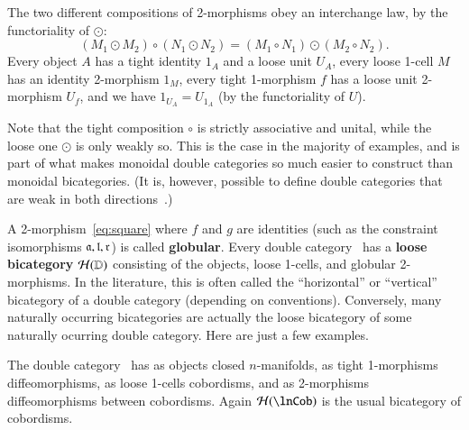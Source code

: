 The two different compositions of 2-morphisms obey an interchange law,
by the functoriality of $\odot$:
\[(M_1\odot M_2) \circ (N_1\odot N_2) = (M_1\circ N_1)\odot (M_2\circ N_2).
\]
Every object $A$ has a tight identity $1_A$ and a loose unit
$U_A$, every loose 1-cell $M$ has an identity 2-morphism $1_M$, every
tight 1-morphism $f$ has a loose unit 2-morphism $U_f$, and we
have $1_{U_A} = U_{1_A}$ (by the functoriality of $U$).

Note that the tight composition $\circ$ is strictly associative and
unital, while the loose one $\odot$ is only weakly so.  This is
the case in the majority of examples, and is part of what makes monoidal double categories so much easier to construct than monoidal bicategories.
(It is, however, possible to define double categories that are weak in both directions~\cite{verity:base-change}.)



A 2-morphism~\eqref{eq:square} where $f$ and $g$ are identities (such
as the constraint isomorphisms $\mathfrak{a},\mathfrak{l},\mathfrak{r}$) is called
\textbf{globular}.  Every double category \lD\ has a
\textbf{loose bicategory} $\mathcal{H}(\mathbb{D})$ consisting of the objects,
loose 1-cells, and globular 2-morphisms.  In the literature, this is often called the ``horizontal'' or ``vertical'' bicategory of a double category (depending on conventions). Conversely, many naturally
occurring bicategories are actually the loose bicategory of some
naturally ocurring double category.  Here are just a few examples.

\begin{eg}
  The double category \lnCob\ has as objects closed $n$-manifolds, as
  tight 1-morphisms diffeomorphisms, as loose 1-cells cobordisms, and as
  2-morphisms diffeomorphisms between cobordisms.  Again $\cH(\lnCob)$
  is the usual bicategory of cobordisms.
\end{eg}

